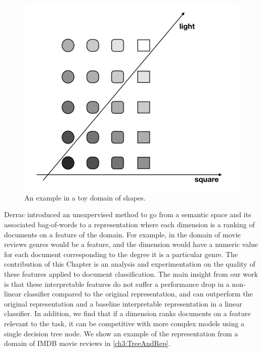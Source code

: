 \begin{figure}[t]
	\includegraphics[width=\textwidth]{images/toy_domain.png}
	\centering
	\caption{An example in a toy domain of shapes.}\label{ch3:ToyDirectionsGraphic}
\end{figure}







Derrac \cite{Derrac2015} introduced an unsupervised method to go from a semantic space and its associated bag-of-words to a representation where each dimension is a ranking of documents on a feature of the domain. For example, in the domain of movie reviews genres would be a feature, and the dimension would have a numeric value for each document corresponding to the degree it is a particular genre. The contribution of this Chapter is an analysis and experimentation on the quality of these features applied to document classification. The main insight from our work is that these interpretable features do not suffer a performance drop in a non-linear classifier compared to the original representation, and can outperform the original representation and a baseline interpretable representation in a linear classifier. In addition, we find that if a dimension ranks documents on a feature relevant to the task, it can be competitive with more complex models using a single decision tree node. We show an example of the representation from a domain of IMDB movie reviews in \ref{ch3:TreeAndRep}. 

